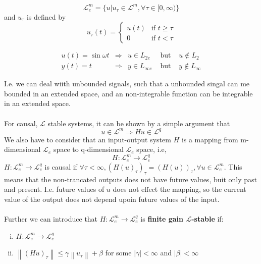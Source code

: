 \documentclass{article}
\begin{document}
\begin{equation}
	\mathcal{L}_e^m =\{u | u_\tau \in \mathcal{L}^{m}, \forall \tau \in [0, \infty )\}
\end{equation}
and $u_\tau$ is defined by
\begin{equation}
	u_\tau (t) = \begin{cases}
		u(t) & \text{if } t \geq \tau \\
		0    & \text{if } t < \tau
	\end{cases}
\end{equation}
\begin{frm-ex}
\begin{equation*}
	\begin{array}{lllll}
		u(t)=\sin \omega t & \Rightarrow & u \in L_{2 e}      & \text { but } & u \notin L_2        \\
		y(t)=t             & \Rightarrow & y \in L_{\infty e} & \text { but } & y \notin L_{\infty}
	\end{array}
\end{equation*}
\end{frm-ex}
I.e. we can deal wiith unbounded signals, such that a unbounded singal can me bounded in an extended space, and an non-integrable function can be integrable in an extended space.
\\\\
For causal, $\mathcal{L}$ stable systems, it can be shown by a simple argument that
\begin{equation}
	u \in \mathcal{L}^{m} \Rightarrow H u \in \mathcal{L}^{q}
\end{equation}
We also have to consider that an input-output system $H$ is a mapping from m-dimensional $\mathcal{L}_e$ space to q-dimensional $\mathcal{L}_e$ space, i.e,
\begin{equation}
	H: \mathcal{L}_e^m \rightarrow \mathcal{L}_e^q
\end{equation}
$H: \mathcal{L}_e^m \rightarrow \mathcal{L}_e^q$ is causal if $\forall \tau  < \infty, (H(u)_\tau)_\tau = (H(u))_\tau, \forall u \in \mathcal{L}_e^{m}$. This means that the non-trancated outputs does not have future values, buit only past and present. I.e. future values of $u$ does not effect the mapping, so the current value of the output does not depend upoin future values of the input.
\\\\
Further we can introduce that $H:\mathcal{L}_e^m \rightarrow \mathcal{L}_e^{q}$ is \textbf{finite gain $\mathcal{L}$-stable} if:
\begin{enumerate}[(i)]
	\item $H:\mathcal{L}_e^{m}\rightarrow \mathcal{L}_e^{q}$
	\item $\left\| (Hu)_\tau  \right\| \leq \gamma  \left\| u_\tau  \right\| + \beta$ for some $\left| \gamma  \right| < \infty $ and $\left| \beta  \right| < \infty $
\end{enumerate}
\end{document}
